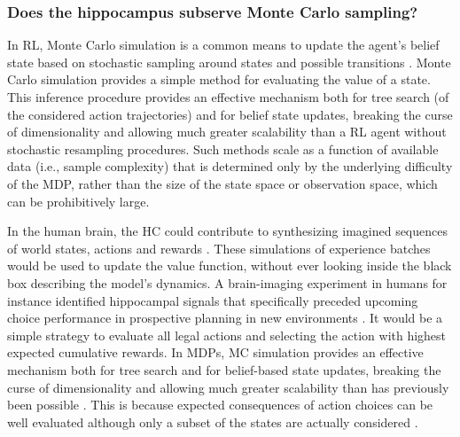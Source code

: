 \documentclass[10pt,letterpaper]{article}
\begin{document}
\subsubsection{Does the hippocampus subserve Monte Carlo sampling?}
In RL, Monte Carlo simulation is a common means to update the agent's belief state
based on stochastic sampling around states and possible transitions \citep{daw2014algorithmic,silver2010monte}.
Monte Carlo simulation provides a simple method for evaluating the value of a state.
This inference procedure provides an effective mechanism both for tree search (of the considered
action trajectories)
and for belief state updates, breaking the curse of dimensionality and allowing much greater scalability than a RL agent without stochastic resampling procedures.
Such methods scale as a function of available data (i.e., sample complexity) that
is determined only by the underlying difficulty of the MDP, rather than the size of the state space or observation space,
which can be prohibitively large.

In the human brain,
the HC could contribute to synthesizing imagined sequences of world states,
actions and rewards \citep{aronov2017, chao2017interaction, boyer2008evolutionary}.
These simulations of experience batches
would be used to update the value function, without ever looking inside the black box describing the model's dynamics.
A brain-imaging experiment in humans for instance identified hippocampal signals that specifically preceded upcoming choice performance in prospective planning in new environments
\citep{kaplan2017neural}.
It would be a simple strategy to evaluate
all legal actions and selecting the action with
highest expected cumulative rewards.
In MDPs, MC simulation provides an effective mechanism both for tree search and for belief-based state updates, breaking the curse of dimensionality and allowing much greater scalability than has previously been possible \citep{silver2016mastering}.
This is because expected consequences of action choices can be well evaluated although only a subset of the states are actually considered \citep{daw2014algorithmic}.
\end{document}
